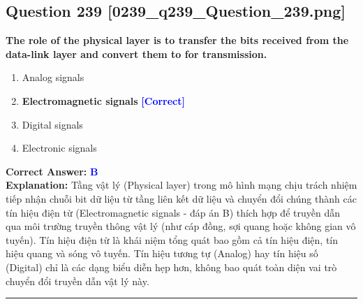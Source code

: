 \documentclass[11pt,a4paper]{article}
\begin{document}
\begin{minipage}{\textwidth}
\subsection*{Question 239 \quad \footnotesize{[0239\_q239\_Question\_239.png]}}
\noindent \textbf{The role of the physical layer is to transfer the bits received from the data-link layer and convert them to for transmission.}

\begin{enumerate}[label=\Alph*.]
    \item Analog signals
    \item \textbf{Electromagnetic signals} \hfill \textcolor{blue}{\textbf{[Correct]}}
    \item Digital signals
    \item Electronic signals
\end{enumerate}

\noindent \textbf{Correct Answer:} \textcolor{blue}{\textbf{B}} \\[2pt]
\noindent \textbf{Explanation:} Tầng vật lý (Physical layer) trong mô hình mạng chịu trách nhiệm tiếp nhận chuỗi bit dữ liệu từ tầng liên kết dữ liệu và chuyển đổi chúng thành các tín hiệu điện từ (Electromagnetic signals - đáp án B) thích hợp để truyền dẫn qua môi trường truyền thông vật lý (như cáp đồng, sợi quang hoặc không gian vô tuyến). Tín hiệu điện từ là khái niệm tổng quát bao gồm cả tín hiệu điện, tín hiệu quang và sóng vô tuyến. Tín hiệu tương tự (Analog) hay tín hiệu số (Digital) chỉ là các dạng biểu diễn hẹp hơn, không bao quát toàn diện vai trò chuyển đổi truyền dẫn vật lý này.

\par\vspace{0.3cm}
\hrule
\vspace{0.3cm}
\end{minipage}
\end{document}
